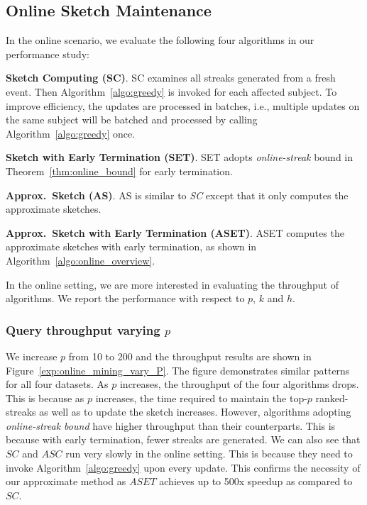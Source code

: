 \subsection{Online Sketch Maintenance}
\label{subsec:exp-online}
In the online scenario, we evaluate the following four algorithms in our performance study:


\noindent\textbf{Sketch Computing (SC)}. SC examines all streaks generated from a fresh event.
Then Algorithm~\ref{algo:greedy} is invoked for each affected subject.
To improve efficiency, the updates are processed in batches, i.e., multiple updates on the same subject will be batched and processed by calling Algorithm~\ref{algo:greedy} once.

\noindent\textbf{Sketch with Early Termination (SET)}. SET adopts \emph{online-streak} bound in Theorem~\ref{thm:online_bound} for early termination.

\noindent\textbf{Approx.~Sketch (AS)}. AS is similar to \emph{SC} except that it only computes the approximate sketches. 

\noindent\textbf{Approx.~Sketch with Early Termination (ASET)}. ASET computes the approximate sketches with early termination, as shown in Algorithm~\ref{algo:online_overview}.

In the online setting, we are more interested in evaluating the throughput of algorithms. We report the performance with respect to $p$, $k$ and $h$.

\subsubsection{Query throughput varying $p$}
We increase $p$ from 10 to 200 and the throughput results are 
shown in Figure~\ref{exp:online_mining_vary_P}.
The figure demonstrates similar patterns for all four datasets. As $p$ increases, 
the throughput of the four algorithms drops.
This is because as $p$ increases, the time required to maintain the top-$p$ ranked-streaks
as well as to update the sketch increases.
However, algorithms adopting 
\emph{online-streak bound} have higher throughput than their counterparts. 
This is because with early termination,
fewer streaks are generated. 
We can also see that $SC$ and $ASC$ run very slowly in the online setting. 
This is because they need to invoke Algorithm~\ref{algo:greedy} upon every update.
This confirms the necessity of our approximate method as $ASET$ achieves up to 500x speedup as compared to $SC$.

